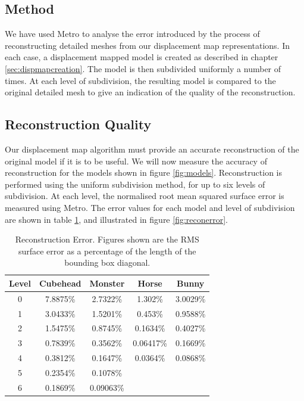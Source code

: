 \subsection{\label{sec:dispmapanim:reconstruction:results:method}Method}

We have used Metro to analyse the error introduced by the process of reconstructing detailed meshes from our displacement map representations. In each case, a displacement mapped model is created as described in chapter \ref{sec:dispmapcreation}. The model is then subdivided uniformly a number of times. At each level of subdivision, the resulting model is compared to the original detailed mesh to give an indication of the quality of the reconstruction.

\subsection{\label{sec:dispmapanim:reconstruction:results:reconquality}Reconstruction Quality}

Our displacement map algorithm must provide an accurate reconstruction of the original model if it is to be useful. We will now measure the accuracy of reconstruction for the models shown in figure \ref{fig:models}. Reconstruction is performed using the uniform subdivision method, for up to six levels of subdivision. At each level, the normalised root mean squared surface error is measured using Metro. The error values for each model and level of subdivision are shown in table \ref{tbl:reconerror}, and illustrated in figure \ref{fig:reconerror}.

\begin{table}
\begin{center}
\begin{tabular}{c||cccc} 
Level & Cubehead & Monster & Horse & Bunny \\
\hline
0 & 7.8875\% & 2.7322\%  & 1.302\%   & 3.0029\% \\
1 & 3.0433\% & 1.5201\%  & 0.453\%   & 0.9588\% \\
2 & 1.5475\% & 0.8745\%  & 0.1634\%  & 0.4027\% \\
3 & 0.7839\% & 0.3562\%  & 0.06417\% & 0.1669\% \\
4 & 0.3812\% & 0.1647\%  & 0.0364\%  & 0.0868\% \\
5 & 0.2354\% & 0.1078\%  &         & \\
6 & 0.1869\% & 0.09063\% &         &
\end{tabular}
\caption[Reconstruction Error]{\label{tbl:reconerror} Reconstruction Error. Figures shown are the RMS surface error as a percentage of the length of the bounding box diagonal.}
\end{center}
\end{table}

